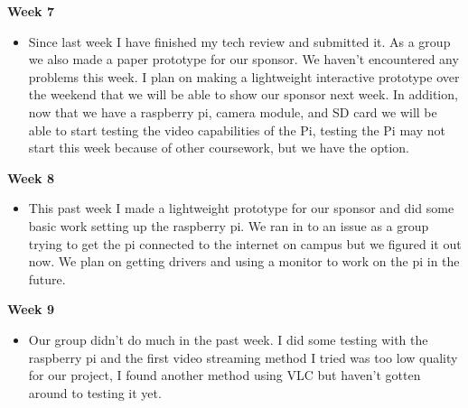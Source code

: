         \textbf{Week 7}
        \begin{itemize}
            \item Since last week I have finished my tech review and submitted it. As a group we also made a paper prototype for our sponsor. We haven't encountered any problems this week. I plan on making a lightweight interactive prototype over the weekend that we will be able to show our sponsor next week. In addition, now that we have a raspberry pi, camera module, and SD card we will be able to start testing the video capabilities of the Pi, testing the Pi may not start this week because of other coursework, but we have the option.
        \end{itemize}
        \textbf{Week 8}
        \begin{itemize}
            \item This past week I made a lightweight prototype for our sponsor and did some basic work setting up the raspberry pi. We ran in to an issue as a group trying to get the pi connected to the internet on campus but we figured it out now. We plan on getting drivers and using a monitor to work on the pi in the future.
        \end{itemize}
        \textbf{Week 9}
        \begin{itemize}
            \item Our group didn't do much in the past week. I did some testing with the raspberry pi and the first video streaming method I tried was too low quality for our project, I found another method using VLC but haven't gotten around to testing it yet.
        \end{itemize}
        
